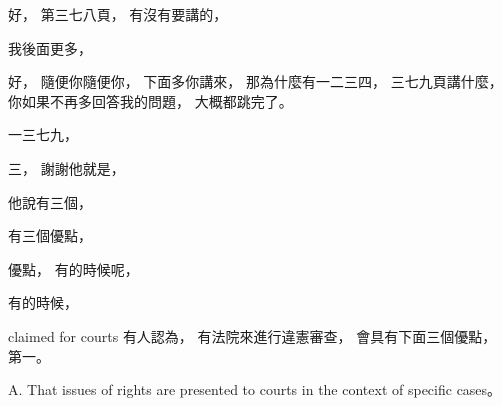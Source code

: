 \hypertarget{w06:cue:2457}{}好，
\hypertarget{w06:cue:2458}{}第三七八頁，
\hypertarget{w06:cue:2459}{}有沒有要講的，

\hypertarget{w06:cue:2460}{}我後面更多，

\hypertarget{w06:cue:2461}{}好，
\hypertarget{w06:cue:2462}{}隨便你隨便你，
\hypertarget{w06:cue:2463}{}下面多你講來，
\hypertarget{w06:cue:2464}{}那為什麼有一二三四，
\hypertarget{w06:cue:2465}{}三七九頁講什麼，
\hypertarget{w06:cue:2466}{}你如果不再多回答我的問題，
\hypertarget{w06:cue:2467}{}大概都跳完了。

\hypertarget{w06:cue:2468}{}一三七九，

\hypertarget{w06:cue:2469}{}三，
\hypertarget{w06:cue:2470}{}謝謝他就是，

\hypertarget{w06:cue:2471}{}他說有三個，

\hypertarget{w06:cue:2472}{}有三個優點，

\hypertarget{w06:cue:2473}{}優點，
\hypertarget{w06:cue:2474}{}有的時候呢，

\hypertarget{w06:cue:2475}{}有的時候，

\hypertarget{w06:cue:2476}{}claimed for courts
\hypertarget{w06:cue:2477}{}有人認為，
\hypertarget{w06:cue:2478}{}有法院來進行違憲審查，
\hypertarget{w06:cue:2479}{}會具有下面三個優點，
\hypertarget{w06:cue:2480}{}第一。

\hypertarget{w06:cue:2481}{}A. That issues of rights are presented to courts in the context of specific cases。

